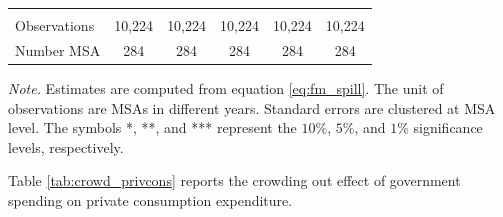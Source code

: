 \documentclass[dv_diss_main.tex]{subfiles}
\begin{document}
\begin{table}[H]
\begin{center}
{\begin{tabular}{lccccc}
    \vspace{4pt} & \begin{footnotesize}\end{footnotesize} & \begin{footnotesize}\end{footnotesize} & \begin{footnotesize}\end{footnotesize} & \begin{footnotesize}\end{footnotesize} & \begin{footnotesize}\end{footnotesize} \\
    Observations & 10,224 & 10,224 & 10,224 & 10,224 & 10,224 \\
    Number MSA & 284 & 284 & 284 & 284 & 284 \\
    \hline
    \end{tabular}
    }
    
    \end{center}
       
    \footnotesize{\textit{Note. }Estimates are computed from  equation \eqref{eq:fm_spill}. The unit of observations are MSAs in different years. Standard errors are clustered at MSA level. The symbols *, **, and *** represent the $10\%$, $5\%$, and $1\%$ significance levels, respectively.}

\end{table}

\newpage
Table \ref{tab:crowd_privcons} reports the crowding out effect of government spending on private consumption expenditure.
\end{document}
